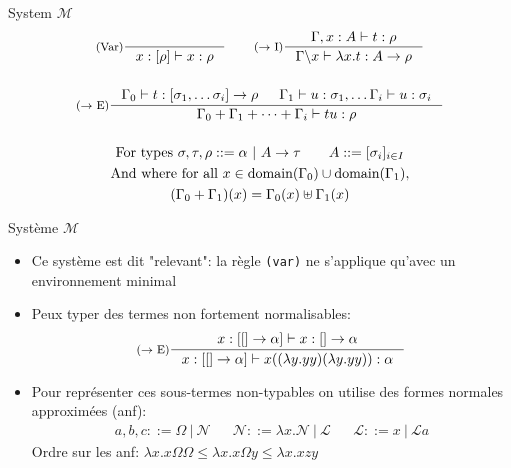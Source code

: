 \documentclass{beamer}
\begin{document}
    \begin{frame}
    \begin{block}{System $\mathcal{M}$}
        \begin{gather*}
                \inference[(Var)]{}{x : [\rho] \vdash x : \rho}
                \qquad
                \inference[($\rightarrow$ I)]{\Gamma, x : A \vdash t : \rho}{\Gamma \backslash x \vdash \lambda x.t : A \rightarrow \rho}
                \\ \\
                \inference[($\rightarrow$ E)]{\Gamma_0 \vdash t : [\sigma_1, \ldots \sigma_i] \rightarrow \rho 
                    & \Gamma_1 \vdash u : \sigma_1, \ldots \Gamma_i \vdash u : \sigma_i}
                {\Gamma_0 + \Gamma_1 + \cdots + \Gamma_i \vdash tu : \rho}
                \\ \\
                \text{For types } \sigma, \tau, \rho ::= \alpha \ | \ A \rightarrow \tau \qquad A ::= [\sigma_i]_{i \in I}
                \\ \text{And where for all } x \in \text{domain}(\Gamma_0)\cup\text{domain}(\Gamma_1) ,
                 \\  (\Gamma_0 + \Gamma_1)(x) = \Gamma_0(x) \uplus\Gamma_1(x) 
        \end{gather*}
    \end{block}
    \end{frame}
    
    \begin{frame}{Système $\mathcal{M}$}
    \begin{itemize}
    \item Ce système est dit "relevant": la règle \texttt{(var)} ne s'applique qu'avec un environnement minimal
    \item Peux typer des termes non fortement normalisables:
        \begin{displaymath}
            \inference[($\rightarrow$ E)]{x:[[] \rightarrow \alpha] \vdash x : [] \rightarrow \alpha}{x : [[] \rightarrow \alpha] \vdash x((\lambda y.yy)(\lambda y.yy)) : \alpha}
        \end{displaymath}
    \item Pour représenter ces sous-termes non-typables on utilise des formes normales approximées (anf):
    \begin{align*}
        a,b,c ::= \Omega\ |\ \mathcal{N} 
        && \mathcal{N} ::= \lambda x.\mathcal{N}\ |\ \mathcal{L}
        && \mathcal{L} ::= x\ |\ \mathcal{L}a
    \end{align*}
            Ordre sur les anf: $\lambda x.x\Omega\Omega \leq \lambda x.x\Omega y \leq \lambda x.xzy$
    \end{itemize}
    \end{frame}
    
\end{document}
